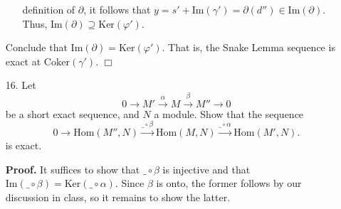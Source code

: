 \documentclass[9pt]{article}
\newcommand{\qed}{\hfill \ensuremath{\Box}}
\newcommand{\Ker}{\text{Ker}}
\newcommand{\Coker}{\text{Coker}}
\newcommand{\im}{\text{Im}}
\begin{document}
\begin{enumerate}
\begin{itemize}
               definition of $\partial$, it follows that
               $y = s' + \im(\gamma') = \partial(d'') \in \im(\partial)$. Thus,
               $\im(\partial) \supseteq \Ker(\varphi')$.
      \end{itemize}
      Conclude that $\im(\partial) = \Ker(\varphi')$. That is, the
      Snake Lemma sequence is exact at $\Coker(\gamma')$. \qed
   \item[16.]  Let
               $$0 \rightarrow M' \stackrel{\alpha}{\longrightarrow} M
               \stackrel{\beta}{\longrightarrow} M'' \rightarrow 0$$
               be a short exact sequence, and $N$ a module. Show that the
               sequence
               $$0 \rightarrow \text{Hom}(M'', N) \stackrel{\_\circ\beta}
               {\longrightarrow} \text{Hom}(M, N)
               \stackrel{\_\circ\alpha}{\longrightarrow} \text{Hom}(M', N).$$
               is exact.
               
      \textbf{Proof.} It suffices to show that $\_\circ\beta$ is injective and
      that $\im(\_\circ\beta) = \Ker(\_\circ\alpha)$. Since $\beta$ is onto, the
      former follows by our discussion in class, so it remains to show the
      latter.
      

\end{enumerate}
\end{document}
